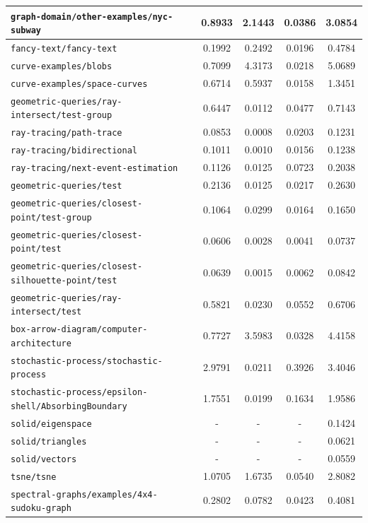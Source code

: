 \begin{longtable}{|p{6.5cm}|c|c|c|c|}
    \texttt{graph-domain/other-examples/nyc-subway} & 0.8933 & 2.1443 & 0.0386 & 3.0854 \\ \hline
    \texttt{fancy-text/fancy-text} & 0.1992 & 0.2492 & 0.0196 & 0.4784 \\ \hline
    \texttt{curve-examples/blobs} & 0.7099 & 4.3173 & 0.0218 & 5.0689 \\ \hline
    \texttt{curve-examples/space-curves} & 0.6714 & 0.5937 & 0.0158 & 1.3451 \\ \hline
    \texttt{geometric-queries/ray-intersect/test-group} & 0.6447 & 0.0112 & 0.0477 & 0.7143 \\ \hline
    \texttt{ray-tracing/path-trace} & 0.0853 & 0.0008 & 0.0203 & 0.1231 \\ \hline
    \texttt{ray-tracing/bidirectional} & 0.1011 & 0.0010 & 0.0156 & 0.1238 \\ \hline
    \texttt{ray-tracing/next-event-estimation} & 0.1126 & 0.0125 & 0.0723 & 0.2038 \\ \hline
    \texttt{geometric-queries/test} & 0.2136 & 0.0125 & 0.0217 & 0.2630 \\ \hline
    \texttt{geometric-queries/closest-point/test-group} & 0.1064 & 0.0299 & 0.0164 & 0.1650 \\ \hline
    \texttt{geometric-queries/closest-point/test} & 0.0606 & 0.0028 & 0.0041 & 0.0737 \\ \hline
    \texttt{geometric-queries/closest-silhouette-point/test} & 0.0639 & 0.0015 & 0.0062 & 0.0842 \\ \hline
    \texttt{geometric-queries/ray-intersect/test} & 0.5821 & 0.0230 & 0.0552 & 0.6706 \\ \hline
    \texttt{box-arrow-diagram/computer-architecture} & 0.7727 & 3.5983 & 0.0328 & 4.4158 \\ \hline
    \texttt{stochastic-process/stochastic-process} & 2.9791 & 0.0211 & 0.3926 & 3.4046 \\ \hline
    \texttt{stochastic-process/epsilon-shell/AbsorbingBoundary} & 1.7551 & 0.0199 & 0.1634 & 1.9586 \\ \hline
    \texttt{solid/eigenspace} & - & - & - & 0.1424 \\ \hline
    \texttt{solid/triangles} & - & - & - & 0.0621 \\ \hline
    \texttt{solid/vectors} & - & - & - & 0.0559 \\ \hline
    \texttt{tsne/tsne} & 1.0705 & 1.6735 & 0.0540 & 2.8082 \\ \hline
    \texttt{spectral-graphs/examples/4x4-sudoku-graph} & 0.2802 & 0.0782 & 0.0423 & 0.4081 \\ \hline

\end{longtable}
